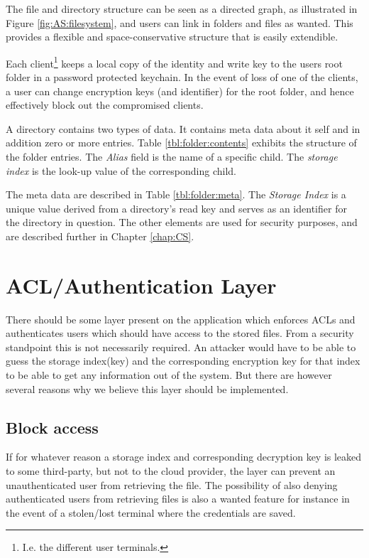 \documentclass[pdftex,english,10pt,b5paper,twoside]{book}
\begin{document}
The file and directory structure can be seen as a directed graph, as illustrated
in Figure \ref{fig:AS:filesystem}, and users can link in folders and files as
wanted. This provides a flexible and space-conservative structure that is easily
extendible.

Each client\footnote{I.e. the different user terminals.} keeps a local copy of
the identity and write key to the users root folder in a password
protected keychain. In the event of loss of one of the clients, a user can change
encryption keys (and identifier) for the root folder, and hence effectively
block out the compromised clients.



A directory contains two types of data. It contains meta data about it self and
in addition zero or more entries. Table \ref{tbl:folder:contents} exhibits the
structure of the folder entries. The \emph{Alias} field is the name of a
specific child. The \emph{storage index} is the look-up value of the
corresponding child.

The meta data are described in Table \ref{tbl:folder:meta}. The \emph{Storage
Index} is a unique value derived from a directory's read key and serves as an
identifier for the directory in question. The other elements are used for
security purposes, and are described further in Chapter \ref{chap:CS}.



\section{ACL/Authentication Layer}
There should be some layer present on the application which enforces \ac{ACL}s and
authenticates users which should have access to the stored files. From a security
standpoint this is not necessarily required. An attacker would have to be able
to guess the storage index(key) and the corresponding encryption key for that
index to be able to get any information out of the system. But there are however
several reasons why we believe this layer should be implemented.

\subsection{Block access}
If for whatever reason a storage index and corresponding decryption key is
leaked to some third-party, but not to the cloud provider, the layer can
prevent an unauthenticated user from retrieving the file. The possibility of
also denying authenticated users from retrieving files is also a wanted feature
for instance in the event of a stolen/lost terminal where the credentials are
saved.
\end{document}
